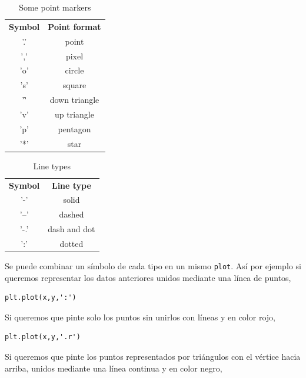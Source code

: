 \begin{paracol}{2}
    
    \begin{table}
        \centering
        \begin{tabular}{|c|c|} \hline
        \textbf{Symbol}     &  \textbf{Point format}\\
             '.'& point \\ \hline
             ','& pixel\\ \hline
             'o'& circle \\ \hline
             's'& square\\ \hline
             '\^'& down triangle\\ \hline
             'v'& up triangle\\ \hline
             'p'& pentagon\\ \hline
             '*'& star\\ \hline
        \end{tabular}
        \caption{Some point markers}
        \label{tab:dots}
    \end{table}

      \begin{table}
        \centering
        \begin{tabular}{|c|c|} \hline
        \textbf{Symbol}     &  \textbf{Line type}\\
             '-'& solid \\ \hline
             '--'& dashed\\ \hline
             '-.'& dash and dot\\ \hline
             ':'& dotted\\ \hline
        \end{tabular}
        \caption{Line types}
        \label{tab:lines}
    \end{table}  
    
    \switchcolumn
    Se puede combinar un símbolo de cada tipo en un mismo \texttt{plot}. Así por ejemplo si queremos representar los datos anteriores unidos mediante una línea de puntos,
\begin{verbatim}
plt.plot(x,y,':')    
\end{verbatim}

Si queremos que pinte solo los puntos sin unirlos con líneas y en color rojo,
\begin{verbatim}
plt.plot(x,y,'.r')
\end{verbatim}

Si queremos que pinte los puntos representados por triángulos con el vértice hacia arriba, unidos mediante una línea continua y en color negro,


\end{paracol}
